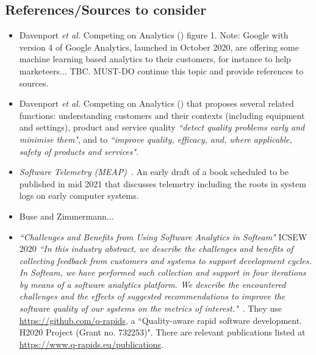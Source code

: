 \subsection{References/Sources to consider}
\begin{itemize}

    \item Davenport \textit{et al.} Competing on Analytics (\cite{davenport2017competing_on_analytics}) figure 1. Note: Google with version 4 of Google Analytics, launched in October 2020, are offering some machine learning based analytics to their customers, for instance to help marketeers... TBC. MUST-DO continue this topic and provide references to sources.
    
    \item Davenport \textit{et al.} Competing on Analytics (\cite{davenport2006competing_on_analytics}) that proposes several related functions: understanding customers and their contexts (including equipment and settings), product and service quality \emph{``detect quality problems early and minimise them"}, and to \emph{``improve quality, efficacy, and, where applicable, safety of products and services"}.
    
    \item \emph{Software Telemetry (MEAP)}~\citep{riedesel2020_software_telemetry_meap_v04}. An early draft of a book scheduled to be published in mid 2021 that discusses telemetry including the roots in system logs on early computer systems.
    
    \item Buse and Zimmermann...~\cite{buse_analytics_2010} 
    
    \item \emph{``Challenges and Benefits from Using Software Analytics in Softeam"} ICSEW 2020 \emph{``In this industry abstract, we describe the challenges and benefits of collecting feedback from customers and systems to support development cycles. In Softeam, we have performed such collection and support in four iterations by means of a software analytics platform. We describe the encountered challenges and the effects of suggested recommendations to improve the software quality of our systems on the metrics of interest."}~\cite{bagnato2020_challenges_and_benefits_from_using_software_analytics_in_softeam}. They use \url{https://github.com/q-rapids}, a ``Quality-aware rapid software development. H2020 Project (Grant no. 732253)". There are relevant publications listed at \url{https://www.q-rapids.eu/publications}.
    

\end{itemize}
